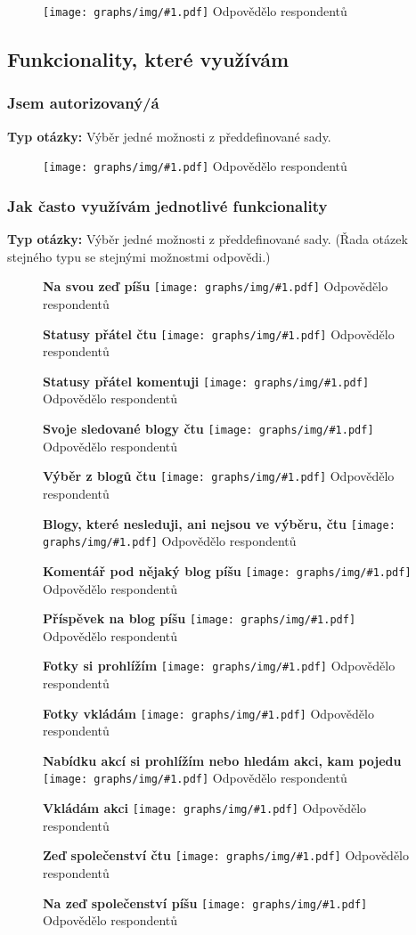 \documentclass[12pt, a4paper, twoside]{article}
\newcommand{\answercount}[1]{Odpovědělo  respondentů}
\newcommand{\includegraph}[2]{
  \begin{figure}[H]
    \centering
    \textbf{#2}
    \texttt{[image: graphs/img/\#1.pdf]}
    \answercount{#1}
  \end{figure}
}
\newcommand{\qtype}{\textbf{Typ otázky:}
}
\newcommand{\pickOne}{Výběr jedné možnosti z předdefinované sady\xspace}
\newcommand{\series}{(Řada otázek stejného typu se stejnými možnostmi odpovědi.)\xspace}
\begin{document}
\includegraph{na_signalech_se_mi_povedlo}{}

\subsection{Funkcionality, které využívám}\label{sec:funkcionality}

\subsubsection{Jsem autorizovaný/á}\label{sec:autorizovany}

\qtype \pickOne.

\includegraph{jsem_autorizovany}{}

\subsubsection{Jak často využívám jednotlivé funkcionality}

\qtype \pickOne. \series

\includegraph{funkcionality_status_pisu}{Na svou zeď píšu}

\includegraph{funkcionality_status_ctu}{Statusy přátel čtu}

\includegraph{funkcionality_status_komentuji}{Statusy přátel komentuji}

\includegraph{funkcionality_sledovane_blogy_ctu}{Svoje sledované blogy čtu}

\includegraph{funkcionality_blogy_vyber_ctu}{Výběr z blogů čtu}

\includegraph{funkcionality_blogy_nesledovane_ctu}{Blogy, které nesleduji, ani nejsou ve výběru, čtu}

\includegraph{funkcionality_blog_komentuji}{Komentář pod nějaký blog píšu}

\includegraph{funkcionality_blog_pisu}{Příspěvek na blog píšu}

\includegraph{funkcionality_fotky_prohlizim}{Fotky si prohlížím}

\includegraph{funkcionality_fotky_vkladam}{Fotky vkládám}

\includegraph{funkcionality_akce_prohlizim}{Nabídku akcí si prohlížím nebo hledám akci, kam pojedu}

\includegraph{funkcionality_akce_vkladam}{Vkládám akci}

\includegraph{funkcionality_zed_spolecenstvi_ctu}{Zeď společenství čtu}

\includegraph{funkcionality_zed_spolecenstvi_pisu}{Na zeď společenství píšu}
\end{document}
